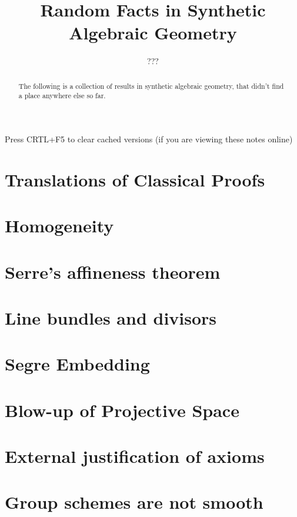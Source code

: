 \documentclass{../util/zariski}
\title{Random Facts in Synthetic Algebraic Geometry}
\author{???}
\begin{document}
\maketitle

\begin{center}
  \color{purple}
  \large{Press CRTL+F5 to clear cached versions}
  \large{(if you are viewing these notes online)}
\end{center}

\begin{abstract}
  The following is a collection of results in synthetic algebraic geometry,
  that didn't find a place anywhere else so far.
\end{abstract}

\tableofcontents

\section{Translations of Classical Proofs}


\section{Homogeneity}


\section{Serre's affineness theorem}


\section{Line bundles and divisors}


\section{Segre Embedding}


\section{Blow-up of Projective Space}


\section{External justification of axioms}


\section{Group schemes are not smooth}


\printindex

\printbibliography
\end{document}
